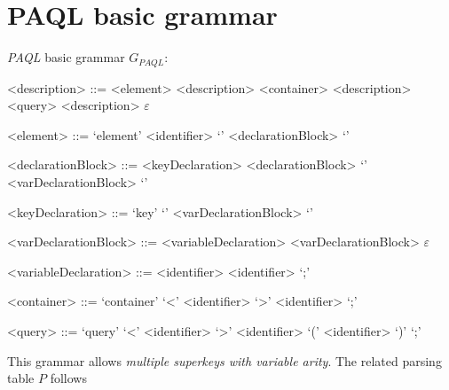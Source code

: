 \documentclass[10pt]{article}  %
\begin{document}
\section{PAQL basic grammar}
    \emph{PAQL} basic grammar $G_{PAQL}$:
    \vspace{1em}
    \begin{mdframed}
        \begin{grammar}
            <description> ::=
                <element> <description> \alt <container> <description> \alt <query> <description> \alt $\varepsilon$

            <element> ::=
                `element' <identifier> `{' <declarationBlock> `}'

            <declarationBlock> ::=
                <keyDeclaration> <declarationBlock> \alt `{' <varDeclarationBlock> `}'

            <keyDeclaration> ::=
                `key' `{' <varDeclarationBlock> `}'

            <varDeclarationBlock> ::=
                <variableDeclaration> <varDeclarationBlock> \alt $\varepsilon$

            <variableDeclaration> ::=
                <identifier> <identifier> `;'

            <container> ::=
                `container' `<' <identifier> `>' <identifier> `;'

            <query> ::=
                `query' `<' <identifier> `>' <identifier> `(' <identifier> `)' `;'
        \end{grammar}
    \end{mdframed}
    \vspace{1em}
    This grammar allows \emph{multiple superkeys with variable arity}. The related parsing table $P$ follows
\end{document}
